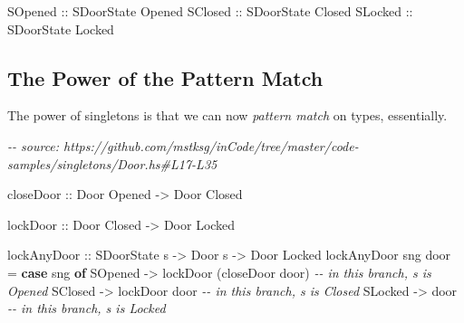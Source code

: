 \documentclass[]{article}
\newenvironment{Shaded}{}{}
\newcommand{\CommentTok}[1]{\textcolor[rgb]{0.38,0.63,0.69}{\textit{#1}}}
\newcommand{\DataTypeTok}[1]{\textcolor[rgb]{0.56,0.13,0.00}{#1}}
\newcommand{\KeywordTok}[1]{\textcolor[rgb]{0.00,0.44,0.13}{\textbf{#1}}}
\newcommand{\NormalTok}[1]{#1}
\newcommand{\OtherTok}[1]{\textcolor[rgb]{0.00,0.44,0.13}{#1}}
\begin{document}
\begin{Shaded}
\begin{Highlighting}[]
\DataTypeTok{SOpened}\OtherTok{ ::} \DataTypeTok{SDoorState} \DataTypeTok{\textquotesingle{}Opened}
\DataTypeTok{SClosed}\OtherTok{ ::} \DataTypeTok{SDoorState} \DataTypeTok{\textquotesingle{}Closed}
\DataTypeTok{SLocked}\OtherTok{ ::} \DataTypeTok{SDoorState} \DataTypeTok{\textquotesingle{}Locked}
\end{Highlighting}
\end{Shaded}

\subsection{The Power of the Pattern
Match}\label{the-power-of-the-pattern-match}

The power of singletons is that we can now \emph{pattern match} on types,
essentially.

\begin{Shaded}
\begin{Highlighting}[]
\CommentTok{{-}{-} source: https://github.com/mstksg/inCode/tree/master/code{-}samples/singletons/Door.hs\#L17{-}L35}

\OtherTok{closeDoor ::} \DataTypeTok{Door} \DataTypeTok{\textquotesingle{}Opened} \OtherTok{{-}\textgreater{}} \DataTypeTok{Door} \DataTypeTok{\textquotesingle{}Closed}

\OtherTok{lockDoor ::} \DataTypeTok{Door} \DataTypeTok{\textquotesingle{}Closed} \OtherTok{{-}\textgreater{}} \DataTypeTok{Door} \DataTypeTok{\textquotesingle{}Locked}

\OtherTok{lockAnyDoor ::} \DataTypeTok{SDoorState}\NormalTok{ s }\OtherTok{{-}\textgreater{}} \DataTypeTok{Door}\NormalTok{ s }\OtherTok{{-}\textgreater{}} \DataTypeTok{Door} \DataTypeTok{\textquotesingle{}Locked}
\NormalTok{lockAnyDoor sng door }\OtherTok{=} \KeywordTok{case}\NormalTok{ sng }\KeywordTok{of}
    \DataTypeTok{SOpened} \OtherTok{{-}\textgreater{}}\NormalTok{ lockDoor (closeDoor door) }\CommentTok{{-}{-} in this branch, s is \textquotesingle{}Opened}
    \DataTypeTok{SClosed} \OtherTok{{-}\textgreater{}}\NormalTok{ lockDoor door             }\CommentTok{{-}{-} in this branch, s is \textquotesingle{}Closed}
    \DataTypeTok{SLocked} \OtherTok{{-}\textgreater{}}\NormalTok{ door                      }\CommentTok{{-}{-} in this branch, s is \textquotesingle{}Locked}
\end{Highlighting}
\end{Shaded}
\end{document}
